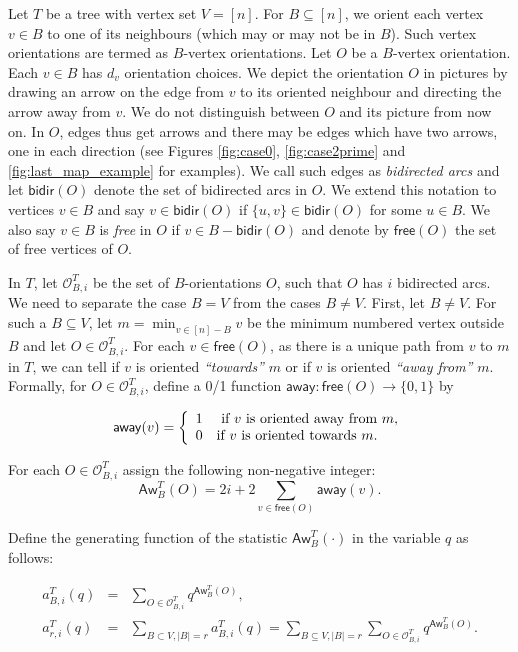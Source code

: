 \documentclass[12pt]{article}
\newcommand{\sO}{  \mathcal{ O}}
\newcommand{\aw}{\mathsf{away}}
\newcommand{\awy}{\mathsf{Aw}}
\newcommand{\bd}{\mathsf{bidir}}
\newcommand{\fr}{\mathsf{free}}
\begin{document}
Let $T$ be a tree with vertex set $V = [n]$.
For $B \subseteq [n]$, we orient each vertex $v \in B$ to one of its neighbours 
(which may or may not be in $B$).  Such vertex orientations are termed
as $B$-vertex orientations.  Let $O$ be a $B$-vertex orientation.  Each $v \in B$ has 
$d_v$ orientation choices.  We depict the orientation $O$ in pictures
by drawing an arrow on the edge from $v$ to its oriented 
neighbour and directing the arrow away from $v$.  
We do not distinguish between $O$ and its picture 
from now on.  In $O$, edges thus get arrows and 
there may be edges 
which have two arrows,  one in each direction (see Figures
\ref{fig:case0}, \ref{fig:case2prime} and \ref{fig:last_map_example}
for examples).  We call such edges as 
{\it bidirected arcs} and let $\bd(O)$ denote the set of 
bidirected arcs in $O$. We extend this notation to vertices $v \in B$ and say
$v \in \bd(O)$ if $\{u,v\} \in \bd(O)$ for some $u \in B$.  We also 
say $v \in B$ is {\sl free} in $O$ if $v \in B - \bd(O)$ and denote
by $\fr(O)$ the set of free vertices of $O$.  


In $T$, let $\sO_{B,i}^T$ be the set of $B$-orientations 
$O$, such that $O$ has $i$ bidirected arcs.   We need to separate 
the case $B = V$ from the cases $B \neq V$.  First, let $B \neq V$.  
For such a $B \subseteq V$, let $m = \min_{v \in [n]-B}^{} v$ be the minimum
numbered vertex outside $B$ and let $O \in \sO_{B,i}^T$.  For each 
$v \in \fr(O)$, as there is a unique path from $v$ to $m$ in $T$,
we can tell if $v$ is oriented {\it ``towards''} $m$ or if $v$ is 
oriented {\it ``away from''} $m$.  Formally, for $O \in \sO_{B,i}^T$, 
define a 0/1 function $\aw: \fr(O) \rightarrow \{0,1\}$ by 

$$\aw(v)=\left\{
\begin{array}{l l}
1 &\mbox{ if $v$ is oriented away from } m, \\
0 & \mbox{if $v$ is oriented towards } m. \\
\end{array}  
\right.$$ 

For each $O\in \sO_{B,i}^T$ assign the following non-negative integer: 
$$\awy_B^{T}(O) = 2i+2\sum_{v\in \fr(O)} \aw(v).$$


Define the generating function of the statistic $\awy_B^{T}(\cdot)$ in the
variable $q$ as follows:

\begin{eqnarray}
\label{eq:def_a_B,i}
a_{B,i}^T(q) & = & \sum_{O \in \sO_{B,i}^T} q^{\awy_B^{T}(O)}, \\
\label{defn:ais_sum}
a_{r,i}^T(q) & = & \sum_{B \subset V, |B|=r} a_{B,i}^T(q) = 
\sum_{B \subseteq V, |B| = r}  \sum_{O \in \sO_{B,i}^T} q^{\awy_B^T(O)}.
\end{eqnarray}
\end{document}
